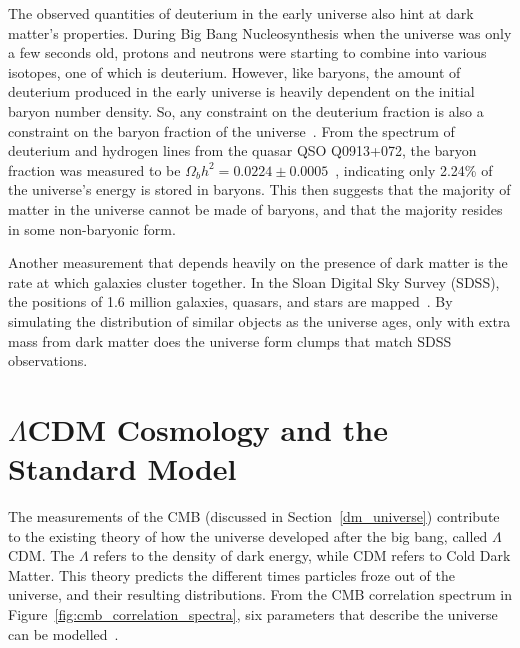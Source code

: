     The observed quantities of deuterium in the early universe also hint at dark matter's properties.
    During Big Bang Nucleosynthesis when the universe was only a few seconds old, protons and neutrons were starting to combine into various isotopes, one of which is deuterium.
    However, like baryons, the amount of deuterium produced in the early universe is heavily dependent on the initial baryon number density.
    So, any constraint on the deuterium fraction is also a constraint on the baryon fraction of the universe~\cite{deuterium1,deuterium2}.
    From the spectrum of deuterium and hydrogen lines from the quasar QSO Q0913+072, the baryon fraction was measured to be $\Omega_{b}h^2 = 0.0224 \pm 0.0005$~\cite{deuterium3}, indicating only 2.24\% of the universe's energy is stored in baryons.
    This then suggests that the majority of matter in the universe cannot be made of baryons, and that the majority resides in some non-baryonic form.
    
    Another measurement that depends heavily on the presence of dark matter is the rate at which galaxies cluster together.
    In the Sloan Digital Sky Survey (SDSS), the positions of 1.6 million galaxies, quasars, and stars are mapped~\cite{sdss_release}.
    By simulating the distribution of similar objects as the universe ages, only with extra mass from dark matter does the universe form clumps that match SDSS observations.
    
    

\section{$\Lambda$CDM Cosmology and the Standard Model}

  The measurements of the CMB (discussed in Section~\ref{dm_universe}) contribute to the existing theory of how the universe developed after the big bang, called $\Lambda$CDM.
  The $\Lambda$ refers to the density of dark energy, while CDM refers to Cold Dark Matter.
  This theory predicts the different times particles froze out of the universe, and their resulting distributions.
  From the CMB correlation spectrum in Figure~\ref{fig:cmb_correlation_spectra}, six parameters that describe the universe can be modelled~\cite{planck_dm_limit,planck_2013_parameters}.

  
